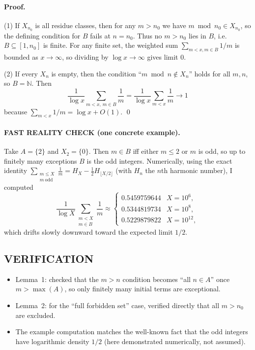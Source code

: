 \paragraph{Proof.}
(1) If $X_{n_0}$ is all residue classes, then for any $m>n_0$ we have $m\bmod n_0\in X_{n_0}$, so the defining condition for $B$ fails at $n=n_0$. Thus no $m>n_0$ lies in $B$, i.e. $B\subseteq[1,n_0]$ is finite. For any finite set, the weighted sum $\sum_{m<x,m\in B}1/m$ is bounded as $x\to\infty$, so dividing by $\log x\to\infty$ gives limit $0$.

(2) If every $X_n$ is empty, then the condition ``$m\bmod n\not\in X_n$'' holds for all $m,n$, so $B=\mathbb{N}$. Then
\[\frac{1}{\log x}\sum_{m<x,\,m\in B}\frac{1}{m}=\frac{1}{\log x}\sum_{m<x}\frac{1}{m}\to 1\]
because $\sum_{m<x}1/m = \log x + O(1)$.
\qed

\paragraph{FAST REALITY CHECK (one concrete example).}
Take $A=\{2\}$ and $X_2=\{0\}$.
Then $m\in B$ iff either $m\le 2$ or $m$ is odd, so up to finitely many exceptions $B$ is the odd integers.
Numerically, using the exact identity $\sum_{\substack{m\le X\\ m\ \mathrm{odd}}} \frac1m = H_X - \tfrac12 H_{\lfloor X/2\rfloor}$ (with $H_n$ the $n$th harmonic number), I computed
\[
\frac{1}{\log X}\sum_{\substack{m<X\\ m\in B}}\frac1m\approx
\begin{cases}
0.5459759644 & X=10^6,\\
0.5344819734 & X=10^8,\\
0.5229879822 & X=10^{12},
\end{cases}
\]
which drifts slowly downward toward the expected limit $1/2$.

\subsection*{VERIFICATION}
\begin{itemize}
\item Lemma~1: checked that the $m>n$ condition becomes ``all $n\in A$'' once $m>\max(A)$, so only finitely many initial terms are exceptional.
\item Lemma~2: for the ``full forbidden set'' case, verified directly that all $m>n_0$ are excluded.
\item The example computation matches the well-known fact that the odd integers have logarithmic density $1/2$ (here demonstrated numerically, not assumed).
\end{itemize}


